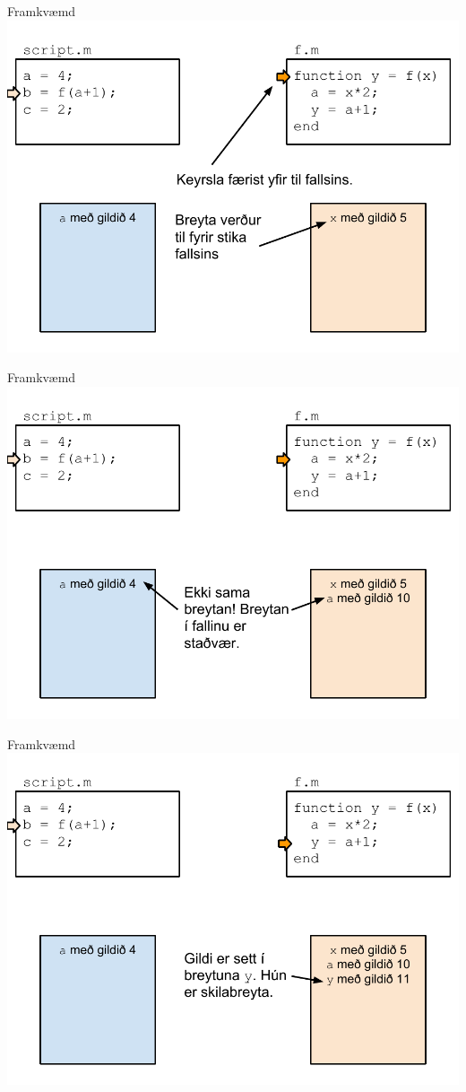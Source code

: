 \documentclass{beamer}
\begin{document}
\begin{frame}{Framkvæmd}
\includegraphics[width=\textwidth]{../Pics/framkvaemd-falls-3}
\end{frame}
\begin{frame}{Framkvæmd}
\includegraphics[width=\textwidth]{../Pics/framkvaemd-falls-4}
\end{frame}
\begin{frame}{Framkvæmd}
\includegraphics[width=\textwidth]{../Pics/framkvaemd-falls-5}
\end{frame}
\end{document}
